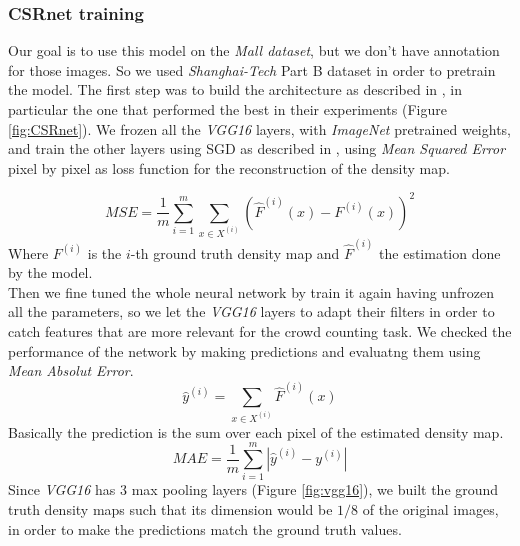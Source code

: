 \documentclass[10pt,twocolumn,letterpaper]{article}
\begin{document}
\subsubsection{CSRnet training}
Our goal is to use this model on the \textit{Mall dataset}, but we don't have annotation for those images. So we used \textit{Shanghai-Tech} Part B dataset in order to pretrain the model. The first step was to build the architecture as described in \cite{li2018csrnet}, in particular the one that performed the best in their experiments (Figure \ref{fig:CSRnet}). We frozen all the \textit{VGG16} layers, with \textit{ImageNet} pretrained weights, and train the other layers using SGD as described in \cite{li2018csrnet}, using \textit{Mean Squared Error} pixel by pixel as loss function for the reconstruction of the density map.

\begin{equation}
	MSE = \frac{1}{m}  \sum_{i = 1}^{m} \sum_{x \in X^{(i)}} (\hat{F}^{(i)}(x) - F^{(i)}(x))^2 \label{eq:MAE}
\end{equation}
Where $F^{(i)}$ is the $i$-th ground truth density map and $\hat{F}^{(i)}$ the estimation done by the model.\\
 Then we fine tuned the whole neural network by train it again having unfrozen all the parameters, so we let the \textit{VGG16} layers to adapt their filters in order to catch features that are more relevant for the crowd counting task. We checked the performance of the network by making predictions and evaluatng them using \textit{Mean Absolut Error}.
\begin{equation}
	\hat{y}^{(i)} = \sum_{x \in X^{(i)}}\hat{F}^{(i)}(x)
\end{equation}
Basically the prediction is the sum over each pixel of the estimated density map.
\begin{equation}
	MAE = \frac{1}{m}  \sum_{i = 1}^{m} |\hat{y}^{(i)} - y^{(i)}|\label{eq:MAE}
\end{equation}
Since \textit{VGG16} has 3 max pooling layers (Figure \ref{fig:vgg16}), we built the ground truth density maps such that its dimension would be $1/8$ of the original images, in order to make the predictions match the ground truth values.
\end{document}
